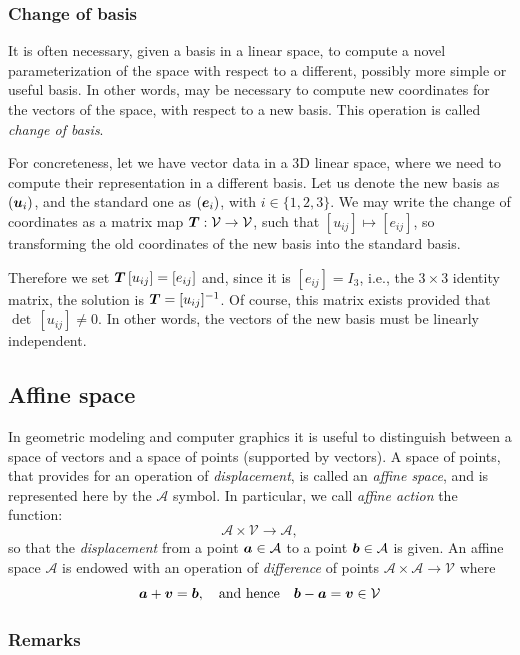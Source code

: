\subsubsection*{Change of basis} 

It is often necessary, given a basis in a linear space, to compute a novel parameterization of the space with respect to a different, possibly more simple or useful basis. In other words, may be necessary to compute new coordinates for the vectors of the space, with respect to a new basis. This operation is called \emph{change of basis}. 

For concreteness, let we have vector data in a 3D linear space, where we need to compute their representation in a different basis. Let us denote the new basis as $({\mbox{\boldmath $u$}}_i)$, and the standard one as $({\mbox{\boldmath $e$}}_i)$, with $i\in \{1,2,3\}$. We may write the change of coordinates as a matrix map ${\mbox{\boldmath $T$}}: \mathcal{V}\to\mathcal{V}$, such that $[u_{ij}] \mapsto [e_{ij}]$, so transforming the old coordinates of the new basis into the standard basis. 

Therefore we set ${\mbox{\boldmath $T$}}\, [u_{ij}] = [e_{ij}]$ and, since it is $[e_{ij}]={I}_{3}$, i.e., the $3\times 3$ identity matrix, the solution is ${\mbox{\boldmath $T$}}=[u_{ij}]^{-1}$. Of course, this matrix exists provided that $\det\, [u_{ij}] \not= 0$. In other words, the vectors of the new basis must be linearly independent.


\subsection{Affine space}
\label{subsec:2:style}

In geometric modeling and computer graphics it is useful to distinguish between a space of vectors and a space of points (supported by vectors). A space of points, that provides for an operation of \emph{displacement}, is called an \emph{affine space}, and is represented here by the $\mathcal{A}$ symbol. In particular, we call \emph{affine action}  the function:
\[
\mathcal{A} \times \mathcal{V} \to \mathcal{A},
\]
so that  the \emph{displacement} from a point ${\mbox{\boldmath $a$}} \in \mathcal{A}$ to a point ${\mbox{\boldmath $b$}} \in \mathcal{A}$ is given. An affine space $\mathcal{A}$ is endowed with an operation of \emph{difference} of points $\mathcal{A} \times \mathcal{A} \to \mathcal{V}$ where
\[
{\mbox{\boldmath $a$}} + {\mbox{\boldmath $v$}} = {\mbox{\boldmath $b$}}, \quad\mbox{and hence}\quad {\mbox{\boldmath $b$}}-{\mbox{\boldmath $a$}} = {\mbox{\boldmath $v$}} \in \mathcal{V} 
\]

\subsubsection*{Remarks}
\label{sec:ccccccc}

